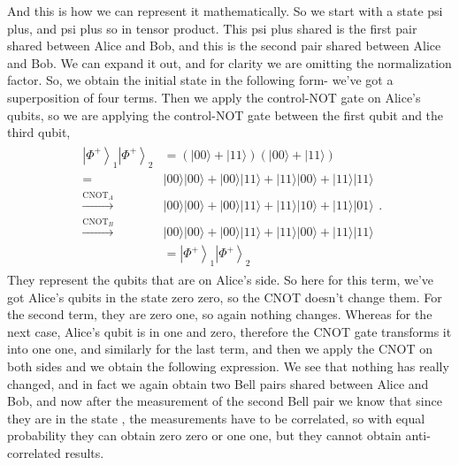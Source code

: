 And this is how we can represent it mathematically. So we start with a state psi plus, and psi plus so in tensor product. This psi plus shared is the first pair shared between Alice and Bob, and this is the second pair shared between Alice and Bob. We can expand it out, and for clarity we are omitting the normalization factor. So, we obtain the initial state in the following form- we've got a superposition of four terms. Then we apply the control-NOT gate on Alice's qubits, so we are applying the control-NOT gate between the first qubit and the third qubit,
\begin{align}
    \begin{aligned}
\left|\Phi^{+}\right\rangle_{1}\left|\Phi^{+}\right\rangle_{2} &=(|00\rangle+|11\rangle)(|00\rangle+|11\rangle) \\
=&|00\rangle|00\rangle+|00\rangle|11\rangle+|11\rangle|00\rangle+|11\rangle|11\rangle \\
\stackrel{\mathrm{CNOT}_{A}}{\longrightarrow} &|00\rangle|00\rangle+|00\rangle|11\rangle+|11\rangle|10\rangle+|11\rangle|01\rangle \\
\stackrel{\mathrm{CNOT}_{B}}{\longrightarrow} &|00\rangle|00\rangle+|00\rangle|11\rangle+|11\rangle|00\rangle+|11\rangle|11\rangle \\
&=\left|\Phi^{+}\right\rangle_{1}\left|\Phi^{+}\right\rangle_{2}
\end{aligned}.
\end{align}
They represent the qubits that are on Alice's side. So here for this term, we've got Alice's qubits in the state zero zero, so the CNOT doesn't change them. For the second term, they are zero one, so again nothing changes. Whereas for the next case, Alice's qubit is in one and zero, therefore the CNOT gate transforms it into one one, and similarly for the last term, and then we apply the CNOT on both sides and we obtain the following expression. We see that nothing has really changed, and in fact we again obtain two Bell pairs shared between Alice and Bob, and now after the measurement of the second Bell pair we know that since they are in the state  \ket{\Phi^+}, the measurements have to be correlated, so with equal probability they can obtain zero zero or one one, but they cannot obtain anti-correlated results.

